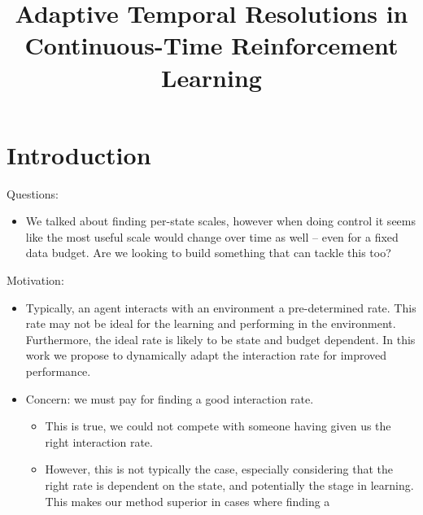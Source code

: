 \documentclass[11pt]{article}
\title{Adaptive Temporal Resolutions in Continuous-Time Reinforcement Learning}
\begin{document}
\maketitle

\section{Introduction}

Questions:
\begin{itemize}
    \item We talked about finding per-state scales, however when doing control it seems like the most useful scale would change over time as well -- even for a fixed data budget. Are we looking to build something that can tackle this too?
\end{itemize}


Motivation:
\begin{itemize}
    \item Typically, an agent interacts with an environment a pre-determined rate. This rate may not be ideal for the learning and performing in the environment. Furthermore, the ideal rate is likely to be state and budget dependent. In this work we propose to dynamically adapt the interaction rate for improved performance.
    \item Concern: we must pay for finding a good interaction rate.
    \begin{itemize}
        \item This is true, we could not compete with someone having given us the right interaction rate.
        \item However, this is not typically the case, especially considering that the right rate is dependent on the state, and potentially the stage in learning. This makes our method superior in cases where finding a 
    \end{itemize}

    
\end{itemize}
\end{document}
